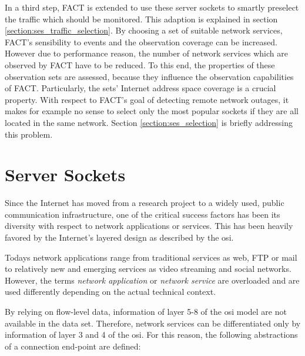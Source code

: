 In a third step, FACT is extended to use these server sockets to smartly preselect the traffic which should be monitored. 
This adaption is explained in section \ref{section:ses_traffic_selection}. 
By choosing a set of suitable network services, \gls{FACT}'s sensibility to events and the observation coverage can be increased. 
However due to performance reason, the number of network services which are observed by \gls{FACT} have to be reduced. 
To this end, the properties of these observation sets are assessed, because they influence the observation capabilities of \gls{FACT}. 
Particularly, the sets' Internet address space coverage is a crucial property. 
With respect to FACT's goal of detecting remote network outages, it makes for example no sense to select only the most popular sockets if they are all located in the same network. 
Section \ref{section:ses_selection} is briefly addressing this problem.

\section{Server Sockets}
Since the Internet has moved from a research project to a widely used, public communication infrastructure, one of the critical success factors has been its diversity with respect to network applications or services. This has been heavily favored by the Internet's layered design as described by the \gls{osi}.

Todays network applications range from traditional services as web, \gls{FTP} or mail to relatively new and emerging services as video streaming and social networks. However, the terms \emph{network application} or \emph{network service} are overloaded and are used differently depending on the actual technical context.

By relying on flow-level data, information of layer 5-8 of the \gls{osi} model are not available in the data set. Therefore, network services can be differentiated only by information of layer 3 and 4 of the \gls{osi}. For this reason, the following abstractions of a connection end-point are defined:

